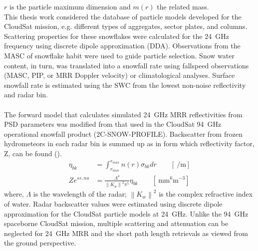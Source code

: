 $r$ is the particle maximum dimension and $m(r)$ the related mass. 
\\
This thesis work considered the database of particle models developed for the CloudSat mission, e.g. different types of aggregates, sector plates, and columns. Scattering properties for these snowflakes were calculated for the \SI{24}{\giga\hertz} frequency using discrete dipole approximation (DDA). Observations from the MASC of snowflake habit were used to guide particle selection. Snow water content, in turn, was translated into a snowfall rate using fallspeed observations (MASC, PIP, or MRR Doppler velocity) or climatological analyses. Surface snowfall rate is estimated using the SWC from the lowest non-noise reflectivity and radar bin. 
\\
\\
The forward model that calculates simulated \SI{24}{\giga\hertz} MRR reflectivities from PSD parameters was modified from that used in the CloudSat \SI{94}{\giga\hertz} operational snowfall product (2C-SNOW-PROFILE). Backscatter from frozen hydrometeors in each radar bin is summed up as in  form which reflectivity factor, Z, can be found (). 
\begin{align}
	\eta_{bk} & = \int_{r_{min}}^{r_{max}} n(r) \sigma_{bk} dr \qquad [\SI{}{\per\metre}] \label{eq:backscatter} \\
	Ze^{ss,na} & = \frac{\Lambda^4}{\left\| K_w \right\|^2 \pi^5} \eta_{bk} \qquad [\SI{}{\mm^6\metre^{-3}}] \label{eq:singleZ}
\end{align}
where, $\Lambda$ is the wavelength of the radar; $\left\| K_w \right\|^2$ is the complex refractive index of water. Radar backscatter values were estimated using discrete dipole approximation for the CloudSat particle models at \SI{24}{\giga\hertz}. Unlike the \SI{94}{\giga\hertz} spaceborne CloudSat mission, multiple scattering and attenuation can be neglected for \SI{24}{\giga\hertz} MRR and the short path length retrievals as viewed from the ground perspective.  


